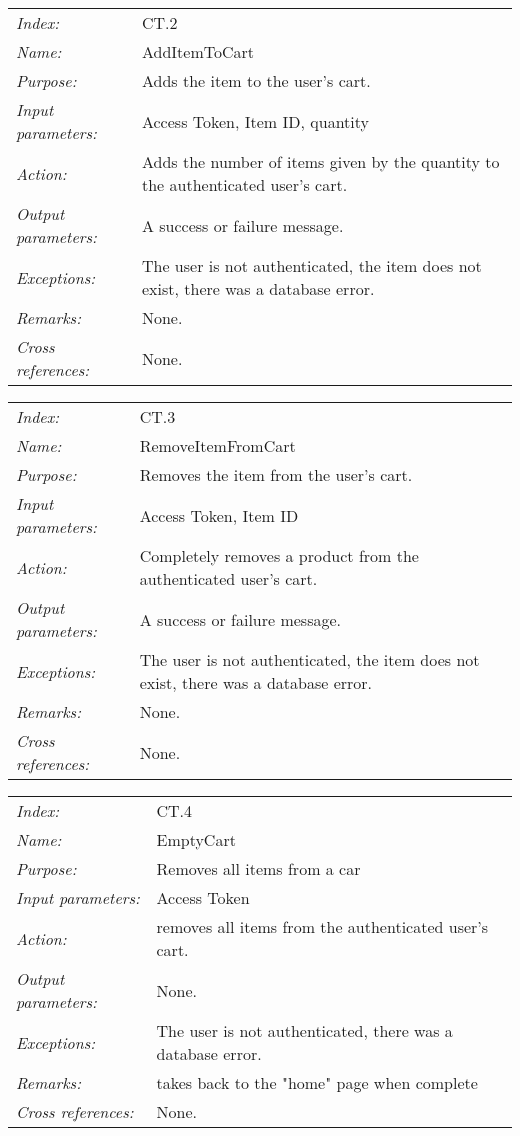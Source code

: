 \documentclass[10pt,letter]{article}
\begin{document}
\begin{tabularx}{\textwidth}{l X}
    \it{Index:} & CT.2 \\
    \it{Name:} & AddItemToCart \\
    \it{Purpose:} & Adds the item to the user's cart. \\
    \it{Input parameters:} & Access Token, Item ID, quantity \\
    \it{Action:} & Adds the number of items given by the quantity to the authenticated user's cart. \\
    \it{Output parameters:} & A success or failure message. \\
    \it{Exceptions:} & The user is not authenticated, the item does not exist, there was a database error. \\
    \it{Remarks:} & None. \\
    \it{Cross references:} & None. \\
    \hline
\end{tabularx}

\begin{tabularx}{\textwidth}{l X}
    \it{Index:} & CT.3 \\
    \it{Name:} & RemoveItemFromCart \\
    \it{Purpose:} & Removes the item from the user's cart. \\
    \it{Input parameters:} & Access Token, Item ID \\
    \it{Action:} & Completely removes a product from the authenticated user's cart. \\
    \it{Output parameters:} & A success or failure message. \\
    \it{Exceptions:} & The user is not authenticated, the item does not exist, there was a database error. \\
    \it{Remarks:} & None. \\
    \it{Cross references:} & None. \\
    \hline
\end{tabularx}

\begin{tabularx}{\textwidth}{l X}
    \it{Index:} & CT.4 \\
    \it{Name:} & EmptyCart \\
    \it{Purpose:} & Removes all items from a car \\
    \it{Input parameters:} & Access Token \\
    \it{Action:} & removes all items from the authenticated user's cart. \\
    \it{Output parameters:} & None. \\
    \it{Exceptions:} & The user is not authenticated, there was a database error. \\
    \it{Remarks:} & takes back to the "home" page when complete \\
    \it{Cross references:} & None. \\
    \hline
\end{tabularx}
\end{document}
